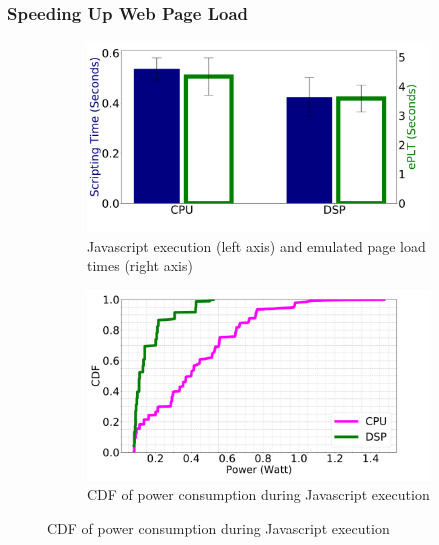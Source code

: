 
\subsubsection{Speeding Up Web Page Load} \label{label:whatif}

\begin{figure}
    \begin{subfigure}[b]{0.5\textwidth}
        \centering
        \includegraphics[width=1\linewidth]{sections/device-work/dsp-plt}
        \caption{Javascript execution (left axis) and emulated page load times (right axis)}
    \end{subfigure}

    \begin{subfigure}[b]{0.5\textwidth}
        \centering
        \includegraphics[width=1\linewidth]{sections/device-work/dsp-power}
        \caption{CDF of power consumption during Javascript execution}
    \end{subfigure}%


\end{figure}
